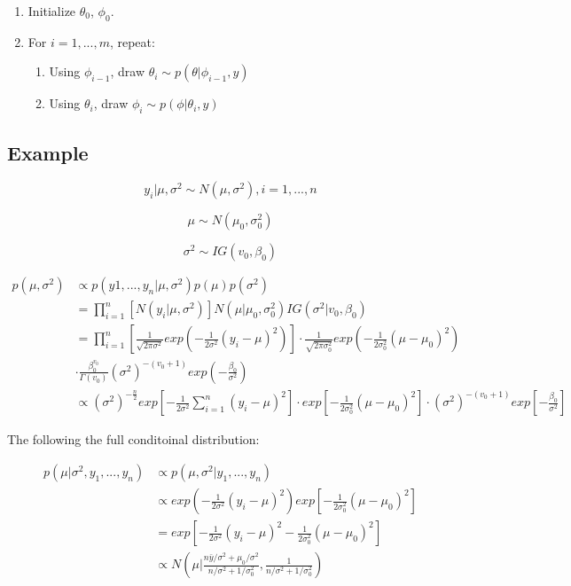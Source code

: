 \documentclass[
]{book}
\providecommand{\tightlist}{%
  \setlength{\itemsep}{0pt}\setlength{\parskip}{0pt}}
\begin{document}
\begin{enumerate}
\def\labelenumi{(\arabic{enumi})}
\item
  Initialize \(\theta_0\), \(\phi_0\).
\item
  For \(i=1,..., m\), repeat:

  \begin{enumerate}
  \def\labelenumii{(\alph{enumii})}
  \tightlist
  \item
    Using \(\phi_{i-1}\), draw \(\theta_i \sim p(\theta|\phi_{i-1},y)\)
  \item
    Using \(\theta_i\), draw \(\phi_i \sim p(\phi|\theta_i,y)\)
  \end{enumerate}
\end{enumerate}

\hypertarget{example}{%
\subsection{Example}\label{example}}

\[y_i|\mu, \sigma^2 \sim N(\mu, \sigma^2),i = 1, ...,n\]

\[\mu \sim N(\mu_0,\sigma_0^2)\]

\[\sigma^2 \sim IG(v_0,\beta_0)\]

\[\begin{aligned} p(\mu, \sigma^2) &\propto p(y1,...,y_n| \mu, \sigma^2)p(\mu)p(\sigma^2) \\ &=\prod_{i=1}^n[N(y_i|\mu,\sigma^2)]N(\mu|\mu_0,\sigma_0^2)IG(\sigma^2|v_0,\beta_0)\\ &= \prod_{i=1}^n [\frac{1}{\sqrt{2\pi \sigma^2}} exp(-\frac{1}{2\sigma^2}(y_i-\mu)^2)] \cdot \frac{1}{\sqrt{2\pi \sigma_0^2}} exp(-\frac{1}{2\sigma_0^2}(\mu-\mu_0)^2) \\ &\cdot \frac{\beta_0^{v_0}}{\Gamma(v_0)}(\sigma^2)^{-(v_0+1)}exp(-\frac{\beta_0}{\sigma^2}) \\ &\propto (\sigma^2)^{-\frac{n}{2}}exp[-\frac{1}{2\sigma^2} \sum_{i=1}^n(y_i-\mu)^2] \cdot exp[-\frac{1}{2\sigma_0^2}(\mu-\mu_0)^2] \cdot (\sigma^2)^{-(v_0+1)}exp[-\frac{\beta_0}{\sigma^2}] \end{aligned}\]

The following the full conditoinal distribution:

\[\begin{aligned} p(\mu| \sigma^2, y_1,...,y_n) &\propto p(\mu,\sigma^2 | y_1,...,y_n)\\ &\propto  exp(-\frac{1}{2\sigma^2}(y_i-\mu)^2) exp[-\frac{1}{2\sigma_0^2}(\mu-\mu_0)^2] \\ &=exp[-\frac{1}{2\sigma^2}(y_i-\mu)^2-\frac{1}{2\sigma_0^2}(\mu-\mu_0)^2] \\ &\propto N(\mu |\frac{n\bar{y}/\sigma^2+\mu_0/\sigma^2}{n/\sigma^2+1/\sigma_0^2},\frac{1}{n/\sigma^2+1/\sigma_0^2})\end{aligned}\]
\end{document}

